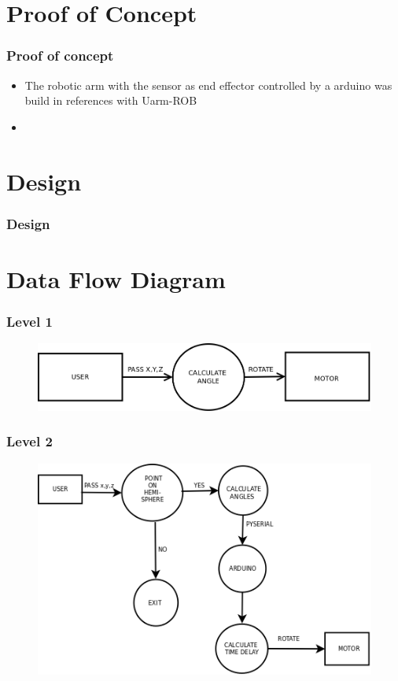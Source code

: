 \documentclass{beamer}
\begin{document}
\section{Proof of Concept}
\begin{frame}
\frametitle{Proof of concept}
\begin{itemize}
\item The robotic arm with the sensor as end effector controlled by a arduino was build in references with  Uarm-ROB
\item 
 
\end{itemize}
\end{frame}

\section{Design}
\begin{frame}
\frametitle{Design}
\end{frame}

\section{Data Flow Diagram}

\begin{frame}
\frametitle{Level 1}
 \begin{figure}
 \includegraphics[height=0.1\linewidth]{level_1.png}
  \end{figure}

\end{frame}



\begin{frame}[shrink=50]
\frametitle{Level 2}
    \begin{figure}
    \hfill\includegraphics[height=0.5\linewidth]{level_2.png}\hspace*{\fill}
    \end{figure}
    \end{frame}
    
\end{document}

